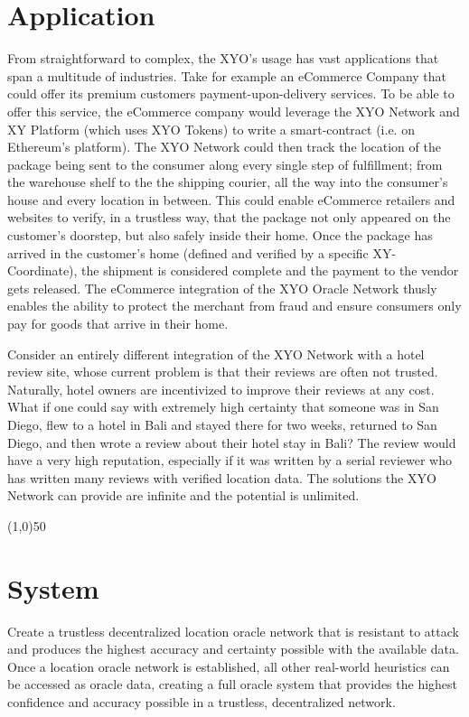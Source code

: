 \documentclass{article}
\begin{document}
\section*{Application}
From straightforward to complex, the \Gls{XYO}'s usage  has vast applications that span a multitude of industries. Take for example an eCommerce Company that could offer its premium customers payment-upon-delivery services. To be able to offer this service, the eCommerce company would leverage the XYO Network and XY Platform (which uses XYO Tokens) to write a \gls{smart-contract} (i.e. on Ethereum's platform). The XYO Network could then track the location of the package being sent to the consumer along every single step of fulfillment; from the warehouse shelf to the the shipping courier, all the way into the consumer's house and every location in between. This could enable eCommerce retailers and websites to verify, in a trustless way, that the package not only appeared on the customer's doorstep, but also safely inside their home. Once the package has arrived in the customer's home (defined and verified by a specific XY-Coordinate), the shipment is considered complete and the payment to the vendor gets released. The eCommerce integration of the XYO Oracle Network thusly enables the ability to protect the merchant from fraud and ensure consumers only pay for goods that arrive in their home.

Consider an entirely different integration of the XYO Network with a hotel review site, whose current problem is that their reviews are often not trusted. Naturally, hotel owners are incentivized to improve their reviews at any cost. What if one could say with extremely high \gls{certainty} that someone was in San Diego, flew to a hotel in Bali and stayed there for two weeks, returned to San Diego, and then wrote a review about their hotel stay in Bali? The review would have a very high reputation, especially if it was written by a serial reviewer who has written many reviews with verified location data. The solutions the XYO Network can provide are infinite and the potential is unlimited.

\begin{center}
\line(1,0){50}
\end{center}

\section {System}
Create a trustless decentralized location \gls{oracle} network that is resistant to attack and produces the highest \gls{accuracy} and \gls{certainty} possible with the available data. Once a location oracle network is established, all other real-world \glspl{heuristic} can be accessed as oracle data, creating a full oracle system that provides the highest confidence and accuracy possible in a trustless, decentralized network.
\end{document}
